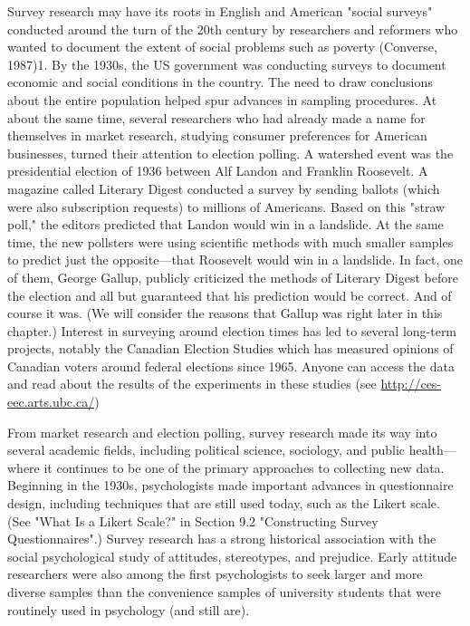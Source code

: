 Survey research may have its roots in English and American "social surveys" conducted around the turn of the 20th century by researchers and reformers who wanted to document the extent of social problems such as poverty (Converse, 1987)1. By the 1930s, the US government was conducting surveys to document economic and social conditions in the country. The need to draw conclusions about the entire population helped spur advances in sampling procedures. At about the same time, several researchers who had already made a name for themselves in market research, studying consumer preferences for American businesses, turned their attention to election polling. A watershed event was the presidential election of 1936 between Alf Landon and Franklin Roosevelt. A magazine called Literary Digest conducted a survey by sending ballots (which were also subscription requests) to millions
of Americans. Based on this "straw poll," the editors predicted that Landon would win in a landslide. At the same time, the new pollsters were using scientific methods with much smaller samples to predict just the opposite---that Roosevelt would win in a landslide. In fact, one of them, George Gallup, publicly criticized the methods of Literary Digest before the election and all but guaranteed that his prediction would be correct. And of course it was. (We will consider the reasons that Gallup was right later in this chapter.) Interest in surveying around election times has led to several long-term projects, notably the Canadian Election Studies which has measured opinions of Canadian voters around federal elections since 1965. Anyone can access the data and read about the results of the experiments in these studies (see \url{http://ces-eec.arts.ubc.ca/})

From market research and election polling, survey research made its way into several academic fields, including political science, sociology, and public health---where it continues to be one of the primary approaches to collecting new data. Beginning in the 1930s, psychologists made important advances in questionnaire design, including techniques that are still used today, such as the Likert scale. (See "What Is a Likert Scale?" in Section 9.2 "Constructing Survey Questionnaires".) Survey research has a strong historical association with the social psychological study of attitudes, stereotypes, and prejudice. Early attitude researchers were also among the first psychologists to seek larger and more diverse samples than the convenience samples of university students that were routinely used in psychology (and still are).

